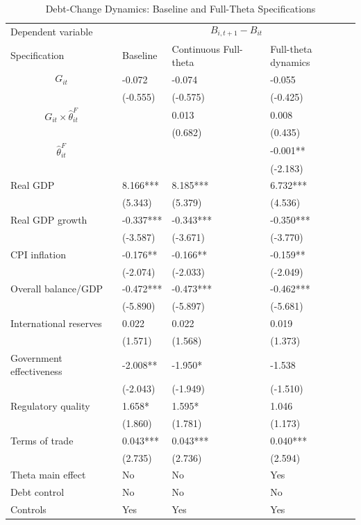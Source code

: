 \begin{table}[H]\centering
\begin{threeparttable}
\caption{Debt-Change Dynamics: Baseline and Full-Theta Specifications}
\label{tab:debt_change_combined_fulltheta}
\scriptsize
\begin{tabularx}{\textwidth}{lYYY}
\toprule
Dependent variable &  \\
\cmidrule(lr){2-4}
Specification & Baseline & Continuous Full-theta & Full-theta dynamics \\
\midrule
$$G_{it}$$ & -0.072 & -0.074 & -0.055 \\
 & (-0.555) & (-0.575) & (-0.425) \\
$$G_{it}\times\widehat{\theta}^{F}_{it}$$ &  & 0.013 & 0.008 \\
 &  & (0.682) & (0.435) \\
$$\widehat{\theta}^{F}_{it}$$ &  &  & -0.001** \\
 &  &  & (-2.183) \\
Real GDP & 8.166*** & 8.185*** & 6.732*** \\
 & (5.343) & (5.379) & (4.536) \\
Real GDP growth & -0.337*** & -0.343*** & -0.350*** \\
 & (-3.587) & (-3.671) & (-3.770) \\
CPI inflation & -0.176** & -0.166** & -0.159** \\
 & (-2.074) & (-2.033) & (-2.049) \\
Overall balance/GDP & -0.472*** & -0.473*** & -0.462*** \\
 & (-5.890) & (-5.897) & (-5.681) \\
International reserves & 0.022 & 0.022 & 0.019 \\
 & (1.571) & (1.568) & (1.373) \\
Government effectiveness & -2.008** & -1.950* & -1.538 \\
 & (-2.043) & (-1.949) & (-1.510) \\
Regulatory quality & 1.658* & 1.595* & 1.046 \\
 & (1.860) & (1.781) & (1.173) \\
Terms of trade & 0.043*** & 0.043*** & 0.040*** \\
 & (2.735) & (2.736) & (2.594) \\
\midrule
Theta main effect & No & No & Yes \\
Debt control & No & No & No \\
Controls & Yes & Yes & Yes \\

\end{tabularx}
\end{threeparttable}
\end{table}
